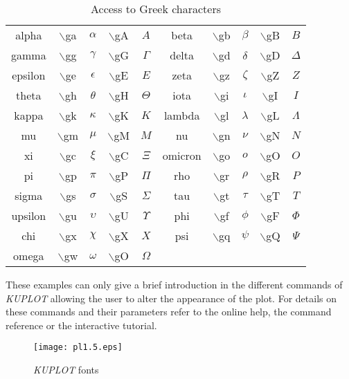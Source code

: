 \begin{table}[!tbp]
\centering
\begin{tabular}{|c|cc|cc||c|cc|cc|}
  \hline
   alpha   & $\backslash$ga  & $\alpha$   & $\backslash$gA &   $A$        &
   beta    & $\backslash$gb  & $\beta $   & $\backslash$gB &   $B$        \\
   gamma   & $\backslash$gg  & $\gamma$   & $\backslash$gG &   $\Gamma$   &
   delta   & $\backslash$gd  & $\delta$   & $\backslash$gD &   $\Delta$   \\
   epsilon & $\backslash$ge  & $\epsilon$ & $\backslash$gE &   $E$        &
   zeta    & $\backslash$gz  & $\zeta $   & $\backslash$gZ &   $Z$        \\
   theta   & $\backslash$gh  & $\theta$   & $\backslash$gH &   $\Theta$   &
   iota    & $\backslash$gi  & $\iota $   & $\backslash$gI &   $I$        \\
   kappa   & $\backslash$gk  & $\kappa$   & $\backslash$gK &   $K$        &
   lambda  & $\backslash$gl  & $\lambda$  & $\backslash$gL &   $\Lambda$  \\
   mu      & $\backslash$gm  & $\mu   $   & $\backslash$gM &   $M$        &
   nu      & $\backslash$gn  & $\nu   $   & $\backslash$gN &   $N$        \\
   xi      & $\backslash$gc  & $\xi   $   & $\backslash$gC &   $\Xi   $   &
   omicron & $\backslash$go  & $o     $   & $\backslash$gO &   $O     $   \\
   pi      & $\backslash$gp  & $\pi   $   & $\backslash$gP &   $\Pi   $   &
   rho     & $\backslash$gr  & $\rho  $   & $\backslash$gR &   $P     $   \\
   sigma   & $\backslash$gs  & $\sigma$   & $\backslash$gS &   $\Sigma$   &
   tau     & $\backslash$gt  & $\tau  $   & $\backslash$gT &   $T     $   \\
   upsilon & $\backslash$gu  & $\upsilon$ & $\backslash$gU &   $\Upsilon$ &
   phi     & $\backslash$gf  & $\phi  $   & $\backslash$gF &   $\Phi  $   \\
   chi     & $\backslash$gx  & $\chi  $   & $\backslash$gX &   $X     $   &
   psi     & $\backslash$gq  & $\psi  $   & $\backslash$gQ &   $\Psi  $   \\
   omega   & $\backslash$gw  & $\omega$   & $\backslash$gO &   $\Omega$   &
           &                 &            &                &              \\
  \hline
\end{tabular}
\caption{\label{pl1-tab3}Access to Greek characters}
\end{table}
%
These examples can only give a brief introduction in the different
commands of {\it KUPLOT} allowing the user to alter the appearance
of the plot. For details on these commands and their parameters
refer to the online help, the command reference or the interactive
tutorial.
%
\begin{figure}[!tb]
   \centering
   \texttt{[image: pl1.5.eps]}
   \caption{{\it KUPLOT} fonts}
   \label{pl1-fig5}
\end{figure}

